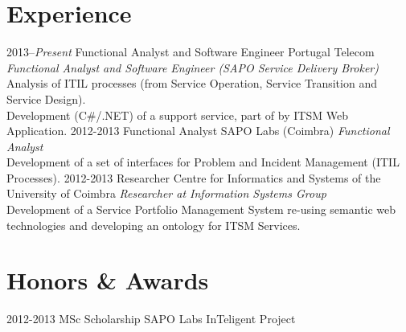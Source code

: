 \documentclass[]{friggeri-cv} %
\begin{document}
\section{Experience}

\begin{entrylist}
\entry
{2013--\emph{Present}}
{Functional Analyst and Software Engineer}
{Portugal Telecom}
{\emph{Functional Analyst and Software Engineer (SAPO Service Delivery Broker)}\\
Analysis of ITIL processes (from Service Operation, Service Transition and Service Design).\\
Development (C\#/.NET) of a support service, part of by ITSM Web Application.}
\entry
{2012-2013}
{Functional Analyst}
{SAPO Labs (Coimbra)}
{\emph{Functional Analyst}\\
Development of a set of interfaces for Problem and Incident Management (ITIL Processes).}
\entry
{2012-2013}
{Researcher}
{Centre for Informatics and Systems of the University of Coimbra}
{\emph{Researcher at Information Systems Group}\\
Development of a Service Portfolio Management System re-using semantic web technologies and developing an ontology for ITSM Services.}

\end{entrylist}


\section{Honors \& Awards}

\begin{entrylist}
\entry
{2012-2013}
{MSc Scholarship}
{SAPO Labs}
{InTeligent Project}
\end{entrylist}

\end{document}
